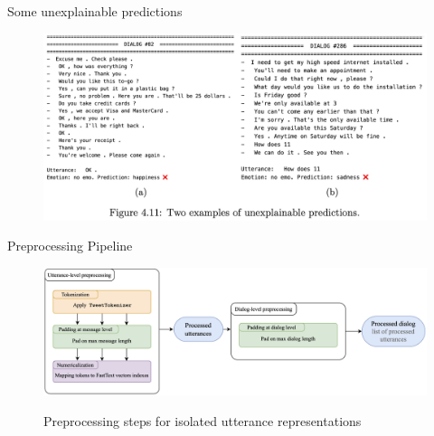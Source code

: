 \documentclass[11pt,aspectratio=169]{beamer}
\begin{document}
    \begin{frame}{Some unexplainable predictions}
        \begin{figure}
            \centering
            \includegraphics[width=\textwidth]{figures/wtf.png}
            \label{fig:wtf}
        \end{figure}
    \end{frame}
    
    \begin{frame}{Preprocessing Pipeline}
        \begin{figure}
        \centering
        \includegraphics[width=\textwidth]{figures/preproc_static2.png}
        \label{fig:preproc_pipeline_isolated2}
        \caption{\centering Preprocessing steps for isolated utterance representations}
    \end{figure}
    \end{frame}
    
\end{document}
